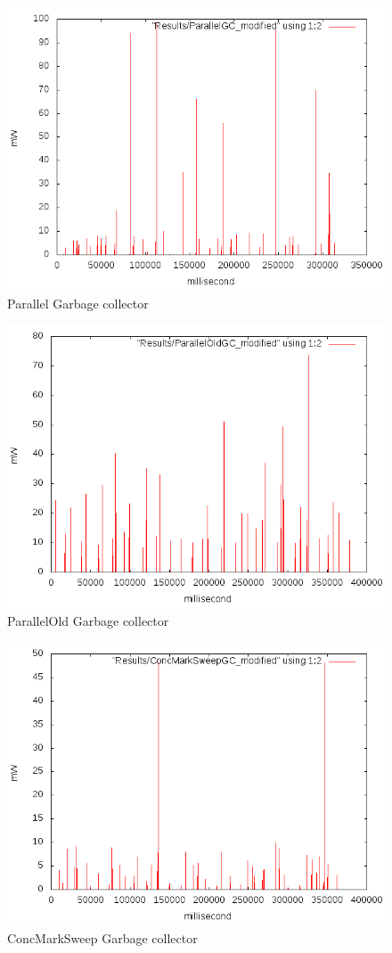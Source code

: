 \begin{figure}[H]
	\centering
	\includegraphics[width=12cm,keepaspectratio]{images/ParallelGC.png}
	\caption{Parallel Garbage collector}
\end{figure}

\begin{figure}[H]
	\centering
	\includegraphics[width=12cm,keepaspectratio]{images/ParallelOldGC.png}
	\caption{ParallelOld Garbage collector}
\end{figure}

\begin{figure}[H]
	\centering
	\includegraphics[width=12cm,keepaspectratio]{images/ConcMarkSweepGC.png}
	\caption{ConcMarkSweep Garbage collector}
\end{figure}

